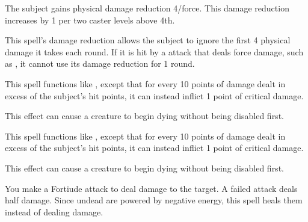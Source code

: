 \spelldur{\durshort}
\begin{spelleffect}
    The subject gains physical damage reduction 4/force. This damage reduction increases by 1 per two caster levels above 4th.
\end{spelleffect}
\begin{spellnotes}
    This spell's damage reduction allows the subject to ignore the first 4 physical damage it takes each round. If it is hit by a attack that deals force damage, such as , it cannot use its damage reduction for 1 round.
\end{spellnotes}

\begin{spelleffect}
    This spell functions like , except that for every 10 points of damage dealt in excess of the subject's hit points, it can instead inflict 1 point of critical damage.
\end{spelleffect}
\begin{spellnotes}
    This effect can cause a creature to begin dying without being disabled first.
\end{spellnotes}

\begin{spelleffect}
    This spell functions like , except that for every 10 points of damage dealt in excess of the subject's hit points, it can instead inflict 1 point of critical damage.
\end{spelleffect}
\begin{spellnotes}
    This effect can cause a creature to begin dying without being disabled first.
\end{spellnotes}

\begin{spelleffect}
    You make a Fortiude attack to deal damage to the target. A failed attack deals half damage. Since undead are powered by negative energy, this spell heals them instead of dealing damage.
\end{spelleffect}

